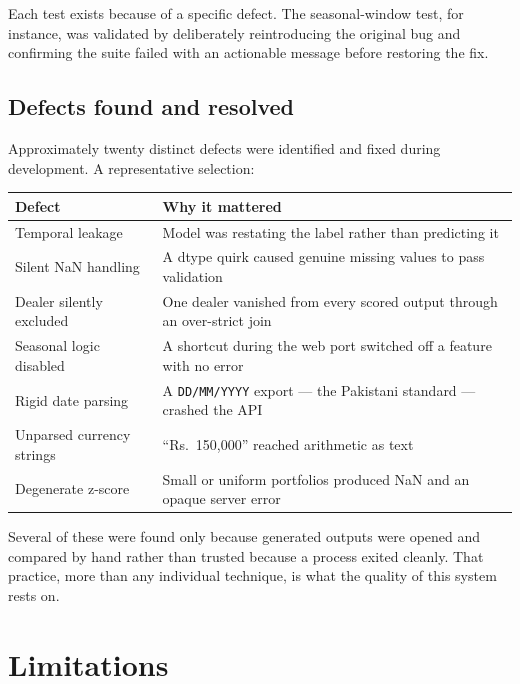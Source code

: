 \documentclass[11pt,a4paper]{article}
\begin{document}
Each test exists because of a specific defect. The seasonal-window test, for
instance, was validated by deliberately reintroducing the original bug and
confirming the suite failed with an actionable message before restoring the fix.

\subsection{Defects found and resolved}

Approximately twenty distinct defects were identified and fixed during
development. A representative selection:

\begin{center}
\small
\begin{tabularx}{\textwidth}{@{}p{4.6cm}X@{}}
\toprule
\textbf{Defect} & \textbf{Why it mattered} \\
\midrule
Temporal leakage & Model was restating the label rather than predicting it \\
Silent NaN handling & A dtype quirk caused genuine missing values to pass validation \\
Dealer silently excluded & One dealer vanished from every scored output through an over-strict join \\
Seasonal logic disabled & A shortcut during the web port switched off a feature with no error \\
Rigid date parsing & A \texttt{DD/MM/YYYY} export --- the Pakistani standard --- crashed the API \\
Unparsed currency strings & ``Rs.~150,000'' reached arithmetic as text \\
Degenerate z-score & Small or uniform portfolios produced NaN and an opaque server error \\
\bottomrule
\end{tabularx}
\end{center}

Several of these were found only because generated outputs were opened and
compared by hand rather than trusted because a process exited cleanly. That
practice, more than any individual technique, is what the quality of this
system rests on.

\section{Limitations}
\end{document}
